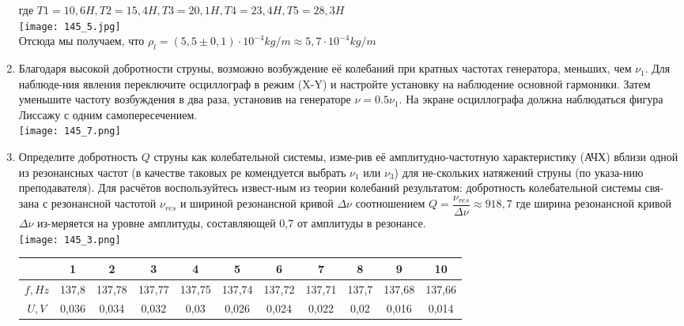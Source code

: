 \documentclass[a4paper, 12pt]{article}%
\begin{document}
\begin{enumerate}
где $T1 = 10,6 H, T2 = 15,4 H, T3 = 20,1 H, T4 = 23,4 H, T5 = 28,3 H$ \\
\texttt{[image: 145\_5.jpg]}\\
Отсюда мы получаем, что $\rho_l = (5,5 \pm 0,1) \cdot 10^{-4} kg/m \approx 5,7 \cdot 10^{-4} kg/m$
\item Благодаря высокой добротности струны, возможно возбуждение её колебаний при кратных частотах генератора, меньших, чем $\nu_1$. Для наблюде-ния явления переключите осциллограф в режим (X-Y) и настройте установку на наблюдение основной гармоники. Затем уменьшите частоту возбуждения в два раза, установив на генераторе $\nu = 0.5 \nu_1$. На экране осциллографа должна наблюдаться фигура Лиссажу с одним самопересечением. \\
\texttt{[image: 145\_7.png]}
\item Определите добротность $Q$ струны как колебательной системы, изме-рив её амплитудно-частотную характеристику (АЧХ) вблизи одной из резонансных частот (в качестве таковых ре комендуется выбрать $\nu_1$ или $\nu_3$) для не-скольких натяжений струны (по указа-нию преподавателя). Для расчётов воспользуйтесь извест-ным из теории колебаний результатом: добротность колебательной системы свя-зана с резонансной частотой $\nu_{res}$ и шириной резонансной кривой $\Delta \nu$ соотношением $Q = \dfrac{\nu_{res}}{\Delta \nu} \approx 918,7$ где ширина резонансной кривой $\Delta \nu$ из-меряется на уровне амплитуды, составляющей 0,7 от амплитуды в резонансе.\\
\texttt{[image: 145\_3.png]}\\
\begin{center}
\begin{tabular}{|c|c|c|c|c|cccccc}
\hline
        & 1      & 2      & 3      & 4      & \multicolumn{1}{c|}{5}      & \multicolumn{1}{c|}{6}      & \multicolumn{1}{c|}{7}      & \multicolumn{1}{c|}{8}      & \multicolumn{1}{c|}{9}      & \multicolumn{1}{c|}{10}     \\ \hline
$f, Hz$ & 137,8  & 137,78 & 137,77 & 137,75 & \multicolumn{1}{c|}{137,74} & \multicolumn{1}{c|}{137,72} & \multicolumn{1}{c|}{137,71} & \multicolumn{1}{c|}{137,7}  & \multicolumn{1}{c|}{137,68} & \multicolumn{1}{c|}{137,66} \\ \hline
$U, V$  & 0,036  & 0,034  & 0,032  & 0,03   & \multicolumn{1}{c|}{0,026}  & \multicolumn{1}{c|}{0,024}  & \multicolumn{1}{c|}{0,022}  & \multicolumn{1}{c|}{0,02}   & \multicolumn{1}{c|}{0,016}  & \multicolumn{1}{c|}{0,014}  \\ \hline

\end{tabular}
\end{center}
\end{enumerate}
\end{document}
